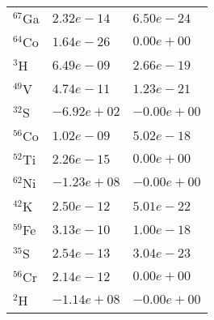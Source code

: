 \begin{tabular}{lll}
 $^{67}$Ga & $2.32e-14 $                                                        & $6.50e-24 $                                                                     \\
 $^{64}$Co & $1.64e-26 $                                                        & $0.00e+00 $                                                                     \\
 $^{3}$H   & $6.49e-09 $                                                        & $2.66e-19 $                                                                     \\
 $^{49}$V  & $4.74e-11 $                                                        & $1.23e-21 $                                                                     \\
 $^{32}$S  & $-6.92e+02 $                                                       & $-0.00e+00 $                                                                    \\
 $^{56}$Co & $1.02e-09 $                                                        & $5.02e-18 $                                                                     \\
 $^{52}$Ti & $2.26e-15 $                                                        & $0.00e+00 $                                                                     \\
 $^{62}$Ni & $-1.23e+08 $                                                       & $-0.00e+00 $                                                                    \\
 $^{42}$K  & $2.50e-12 $                                                        & $5.01e-22 $                                                                     \\
 $^{59}$Fe & $3.13e-10 $                                                        & $1.00e-18 $                                                                     \\
 $^{35}$S  & $2.54e-13 $                                                        & $3.04e-23 $                                                                     \\
 $^{56}$Cr & $2.14e-12 $                                                        & $0.00e+00 $                                                                     \\
 $^{2}$H   & $-1.14e+08 $                                                       & $-0.00e+00 $                                                                    \\

\end{tabular}
